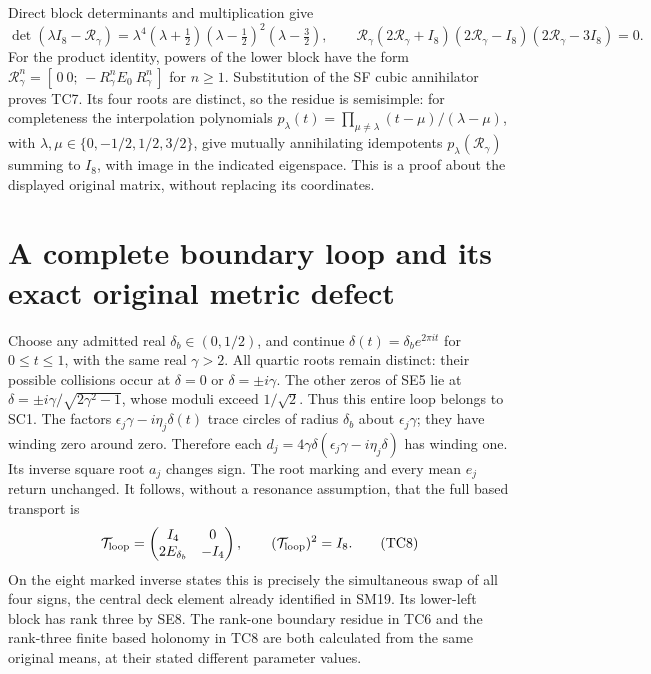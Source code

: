 Direct block determinants and multiplication give
\[
 \det(\lambda I_8-\mathcal R_\gamma)
 =\lambda^4(\lambda+\tfrac12)
                  (\lambda-\tfrac12)^2(\lambda-\tfrac32),
 \qquad
 \mathcal R_\gamma(2\mathcal R_\gamma+I_8)
 (2\mathcal R_\gamma-I_8)(2\mathcal R_\gamma-3I_8)=0.
 \tag{TC7}
\]
For the product identity, powers of the lower block have the form
$\mathcal R_\gamma^n=[\,0\ 0;\,-R_\gamma^nE_0\ R_\gamma^n\,]$
for $n\ge1$. Substitution of the SF cubic annihilator proves TC7.
Its four roots are distinct, so the residue is semisimple: for
completeness the interpolation polynomials
$p_\lambda(t)=\prod_{\mu\ne\lambda}(t-\mu)/(\lambda-\mu)$,
with $\lambda,\mu\in\{0,-1/2,1/2,3/2\}$, give mutually
annihilating idempotents $p_\lambda(\mathcal R_\gamma)$ summing
to $I_8$, with image in the indicated eigenspace. This is a proof
about the displayed original matrix, without replacing its coordinates.

\section{A complete boundary loop and its exact original metric defect}
Choose any admitted real $\delta_b\in(0,1/2)$, and continue
$\delta(t)=\delta_b e^{2\pi it}$ for $0\le t\le1$, with the same
real $\gamma>2$. All quartic roots remain distinct: their possible
collisions occur at $\delta=0$ or $\delta=\pm i\gamma$. The other
zeros of SE5 lie at
$\delta=\pm i\gamma/\sqrt{2\gamma^2-1}$, whose moduli exceed
$1/\sqrt2$. Thus this entire loop belongs to SC1.
The factors
$\epsilon_j\gamma-i\eta_j\delta(t)$ trace circles of radius
$\delta_b$ about $\epsilon_j\gamma$; they have winding zero around
zero. Therefore each
$d_j=4\gamma\delta(\epsilon_j\gamma-i\eta_j\delta)$ has winding
one. Its inverse square root $a_j$ changes sign. The root marking
and every mean $e_j$ return unchanged. It follows, without a
resonance assumption, that the full based transport is
\[
 \mathcal T_{\rm loop}=
 \begin{pmatrix}I_4&0\\2E_{\delta_b}&-I_4\end{pmatrix},\qquad
 (\mathcal T_{\rm loop})^2=I_8.
 \tag{TC8}
\]
On the eight marked inverse states this is precisely the simultaneous
swap of all four signs, the central deck element already identified
in SM19. Its lower-left block has rank three by SE8. The rank-one
boundary residue in TC6 and the rank-three finite based holonomy in
TC8 are both calculated from the same original means, at their stated
different parameter values.

